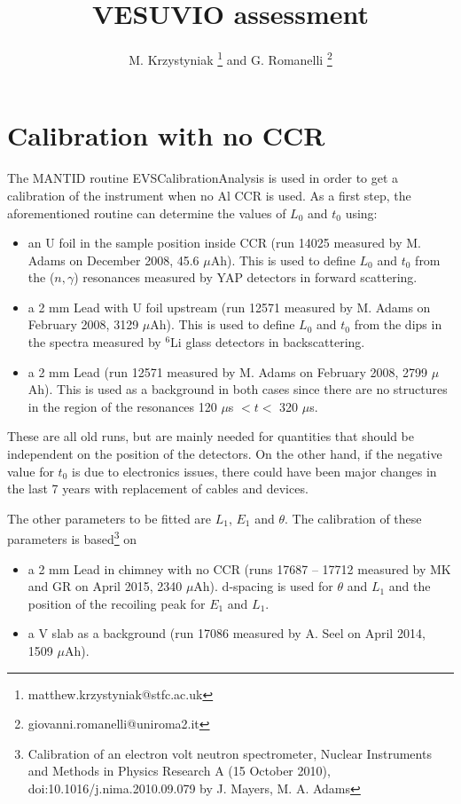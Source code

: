 \documentclass[11pt,a4paper,oneside]{article}
\title{VESUVIO assessment}
\author{M. Krzystyniak \footnote{matthew.krzystyniak@stfc.ac.uk} and G. Romanelli \footnote{giovanni.romanelli@uniroma2.it}}
\begin{document}
\maketitle

\section{Calibration with no CCR}

The MANTID routine EVSCalibrationAnalysis is used in order to get a calibration of the instrument when no Al CCR is used. As a first step, the aforementioned routine can determine the values of $L_0$ and $t_0$ using:
\begin{itemize}
\item  an U foil in the sample position inside CCR (run 14025 measured by M. Adams on December 2008, 45.6 $\mu$Ah). This is used to define $L_0$ and $t_0$ from the ($n,\gamma$) resonances measured by YAP detectors in forward scattering.
\item a 2 mm Lead with U foil upstream (run 12571 measured by M. Adams on February 2008, 3129 $\mu$Ah). This is used to define $L_0$ and $t_0$ from the dips in the spectra measured by $^6$Li glass detectors in backscattering.
\item a 2 mm Lead (run 12571 measured by M. Adams on February 2008, 2799 $\mu$Ah). This is used as a background in both cases since there are no structures in the region of the resonances 120 $\mu$s $< t <$ 320 $\mu$s.
\end{itemize}
These are all old runs, but are mainly needed for quantities that should be independent on the position of the detectors. On the other hand, if the negative value for $t_0$ is due to electronics issues, there could have been major changes in the last 7 years with replacement of cables and devices. 

The other parameters to be fitted are $L_1$, $E_1$ and $\theta$. The calibration of these parameters is based\footnote{Calibration of an electron volt neutron spectrometer, Nuclear Instruments and Methods in Physics Research A (15 October 2010), doi:10.1016/j.nima.2010.09.079 by J. Mayers, M. A. Adams} on
\begin{itemize}
\item a 2 mm Lead in chimney with no CCR (runs 17687 -- 17712 measured by MK and GR on April 2015, 2340 $\mu$Ah). d-spacing is used for $\theta$ and $L_1$ and the position of the recoiling peak for $E_1$ and $L_1$.
\item a V slab as a background (run 17086 measured by A. Seel on April 2014, 1509 $\mu$Ah).
\end{itemize}
\end{document}
